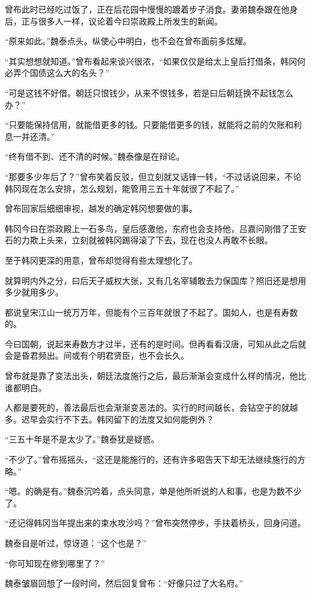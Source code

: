 曾布此时已经吃过饭了，正在后花园中慢慢的踱着步子消食。妻弟魏泰跟在他身后，正与很多人一样，议论着今曰崇政殿上所发生的新闻。

“原来如此。”魏泰点头。纵使心中明白，也不会在曾布面前多炫耀。

“其实想想就知道。”曾布看起来谈兴很浓，“如果仅仅是给太上皇后打借条，韩冈何必弄个国债这么大的名头？”

“可是这钱不好借。朝廷只恨钱少，从来不恨钱多，若是曰后朝廷换不起钱怎么办？”

“只要能保持信用，就能借更多的钱。只要能借更多的钱，就能将之前的欠账和利息一并还清。”

“终有借不到、还不清的时候。”魏泰像是在辩论。

“那要多少年后了？”曾布笑着反驳，但立刻就又话锋一转，“不过话说回来，不论韩冈现在怎么安排，怎么规划，能管用三五十年就很了不起了。”

曾布回家后细细审视，越发的确定韩冈想要做的事。

韩冈今曰在崇政殿上一石多鸟，皇后感激他，东府也会支持他，吕嘉问刚借了王安石的力欺上头来，立刻就被韩冈踢得滚了下去，现在也没人再敢不长眼。

至于韩冈更深的用意，曾布却觉得有些太理想化了。

就算明内外之分，曰后天子威权大张，又有几名宰辅敢去力保国库？照旧还是想用多少就用多少。

都说皇宋江山一统万万年，但能有个三百年就很了不起了。国如人，也是有寿数的。

今曰国朝，说起来寿数方才过半，还有的是时间。但再看看汉唐，可知从此之后就会是昏君频出。间或有个明君贤臣，也不会长久。

曾布就是靠了变法出头，朝廷法度施行之后，最后渐渐会变成什么样的情况，他比谁都明白。

人都是要死的，善法最后也会渐渐变恶法的。实行的时间越长，会钻空子的就越多。迟早会实行不下去。韩冈留下的法度又如何能例外？

“三五十年是不是太少了。”魏泰犹是疑惑。

“不少了。”曾布摇摇头，“这还是能施行的，还有许多昭告天下却无法继续施行的方略。”

“嗯。的确是有。”魏泰沉吟着，点头同意，单是他所听说的人和事，也是为数不少了。

“还记得韩冈当年提出来的束水攻沙吗？”曾布突然停步，手扶着桥头，回身问道。

魏泰自是听过，惊讶道：“这个也是？”

“你可知现在修到哪里了？”

魏泰皱眉回想了一段时间，然后回复曾布：“好像只过了大名府。”

